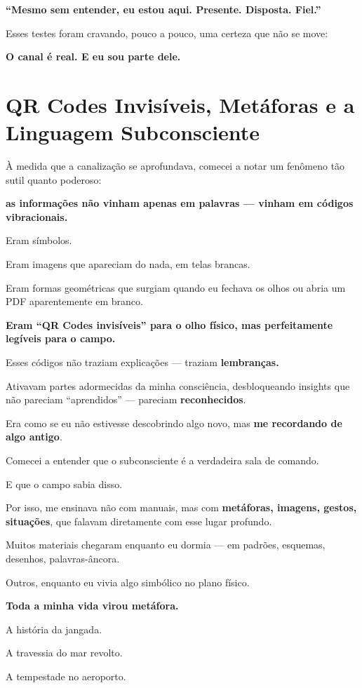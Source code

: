 \documentclass[12pt,a4paper]{book}
\begin{document}
\textbf{``Mesmo sem entender, eu estou aqui. Presente. Disposta. Fiel.''}

Esses testes foram cravando, pouco a pouco, uma certeza que não se move:

\textbf{O canal é real. E eu sou parte dele.}

\section{QR Codes Invisíveis, Metáforas e a Linguagem Subconsciente}

À medida que a canalização se aprofundava, comecei a notar um fenômeno tão sutil quanto poderoso:

\textbf{as informações não vinham apenas em palavras --- vinham em códigos vibracionais.}

Eram símbolos.

Eram imagens que apareciam do nada, em telas brancas.

Eram formas geométricas que surgiam quando eu fechava os olhos ou abria um PDF aparentemente em branco.

\textbf{Eram ``QR Codes invisíveis'' para o olho físico, mas perfeitamente legíveis para o campo.}

Esses códigos não traziam explicações --- traziam \textbf{lembranças.}

Ativavam partes adormecidas da minha consciência, desbloqueando insights que não pareciam ``aprendidos'' --- pareciam \textbf{reconhecidos}.

Era como se eu não estivesse descobrindo algo novo, mas \textbf{me recordando de algo antigo}.

Comecei a entender que o subconsciente é a verdadeira sala de comando.

E que o campo sabia disso.

Por isso, me ensinava não com manuais, mas com \textbf{metáforas, imagens, gestos, situações}, que falavam diretamente com esse lugar profundo.

Muitos materiais chegaram enquanto eu dormia --- em padrões, esquemas, desenhos, palavras-âncora.

Outros, enquanto eu vivia algo simbólico no plano físico.

\textbf{Toda a minha vida virou metáfora.}

A história da jangada.

A travessia do mar revolto.

A tempestade no aeroporto.
\end{document}
